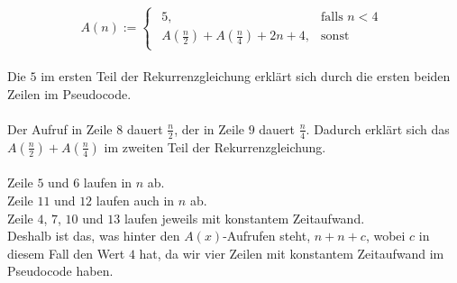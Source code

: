 \documentclass{article}
\begin{document}
\[
    A(n) :=  \begin{cases}
		\begin{array}{ll}
	    	5, & \text{falls }n<4\\
			A(\frac{n}{2})+A(\frac{n}{4})+2n+4, &\text{sonst}
		\end{array}
	\end{cases}
\]
\\
Die $5$ im ersten Teil der Rekurrenzgleichung erklärt sich durch die ersten beiden Zeilen im Pseudocode.\\\\
Der Aufruf in Zeile $8$ dauert $\frac{n}{2}$, der in Zeile $9$ dauert $\frac{n}{4}$. Dadurch erklärt sich das $A(\frac{n}{2})+A(\frac{n}{4})$ im zweiten Teil der Rekurrenzgleichung.\\\\
Zeile $5$ und $6$ laufen in $n$ ab.\\
Zeile $11$ und $12$ laufen auch in $n$ ab.\\
Zeile $4$, $7$, $10$ und $13$ laufen jeweils mit konstantem Zeitaufwand.\\
Deshalb ist das, was hinter den $A(x)$-Aufrufen steht, $n+n+c$, wobei $c$ in diesem Fall den Wert $4$ hat, da wir vier Zeilen mit konstantem Zeitaufwand im Pseudocode haben.
\end{document}
